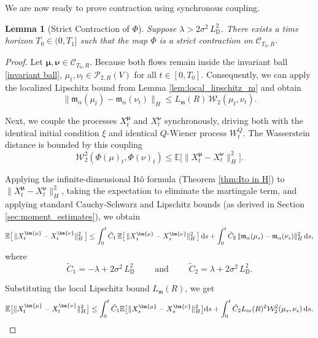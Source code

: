 \documentclass[12pt]{amsart}
\newcommand{\D}[1]{\mbox{\rm #1}}
\newcommand{\dd}{\D{d}}
\numberwithin{equation}{section}
\newtheorem{lemma}[theorem]{Lemma}
\begin{document}
We are now ready to prove contraction using synchronous coupling. 

\begin{lemma}[Strict Contraction of $\Phi$]
\label{lem:contraction}
Suppose $\lambda > 2\sigma^2\, L_{\mathsf{D}}^2$.
There exists a time horizon $T_0 \in (0, T_1]$ such that the map $\Phi$ is a strict contraction on $\mathscr{C}_{T_0, R}$.
\end{lemma}

\begin{proof}
Let ${\bm{\mu}}, {\bm{\nu}} \in \mathscr{C}_{T_0, R}$. Because both flows remain inside the invariant ball \eqref{invariant ball}, $\mu_t, \nu_t \in \mathscr{P}_{2,R}(V)$ for all $t \in [0, T_0]$. Consequently, we can apply the localized Lipschitz bound from Lemma \ref{lem:local_lipschitz_m} and obtain 
\begin{equation*}
    \|\mathfrak{m}_\alpha(\mu_t) - \mathfrak{m}_\alpha(\nu_t)\|_H \leq L_\mathfrak{m}(R) \, \mathcal{W}_2(\mu_t, \nu_t).
\end{equation*}

Next, we couple the processes $X^{\bm{\mu}}_t$ and $X^{\bm{\nu}}_t$ synchronously, driving both with the identical initial condition $\xi$ and identical $Q$-Wiener process $W_t^Q$. The Wasserstein distance is bounded by this coupling
\begin{equation*}
    \mathcal{W}_2^2(\Phi(\mu)_t, \Phi(\nu)_t) \leq \mathbb{E}\big[\|X^{\bm{\mu}}_t - X^{\bm{\nu}}_t\|_H^2\big].
\end{equation*}

Applying the infinite-dimensional It\^o formula (Theorem \ref{thm:Ito in H}) to $\|X^{\bm{\mu}}_t - X^{\bm{\nu}}_t\|_H^2$, taking the expectation to eliminate the martingale term, and applying standard Cauchy-Schwarz and Lipschitz bounds (as derived in Section \ref{sec:moment_estimates}), we obtain 
\begin{equation*}
    \mathbb{E}\big[\,\|X^{\bm{\mu}}_t - X^{\bm{\nu}}_t\|_H^2\,\big] \leq \int_0^t \tilde{C}_1 \,\mathbb{E}\big[\,\|X^{\bm{\mu}}_s - X^{\bm{\nu}}_s\|_H^2\,\big]\, \dd s + \int_0^t \tilde{C}_2\, \|\mathfrak{m}_\alpha(\mu_s) - \mathfrak{m}_\alpha(\nu_s)\|_H^2\, \dd s,
\end{equation*}
where 
\[
    \tilde{C}_1 = -\lambda + 2\sigma^2\, L_{\mathsf{D}}^2 \qquad \text{ and } \qquad \tilde{C}_2 = \lambda + 2\sigma^2\, L_{\mathsf{D}}^2.
\]

Substituting the local Lipschitz bound $L_\mathfrak{m}(R)$, we get 
\begin{equation*}
    \mathbb{E}\big[\|X^{\bm{\mu}}_t - X^{\bm{\nu}}_t\|_H^2\big] \leq \int_0^t \tilde{C}_1 \mathbb{E}\big[\|X^{\bm{\mu}}_s - X^{\bm{\nu}}_s\|_H^2\big] \dd s + \int_0^t \tilde{C}_2 L_m(R)^2 \mathcal{W}_2^2(\mu_s, \nu_s)\, \dd s.
\end{equation*}


\end{proof}
\end{document}
